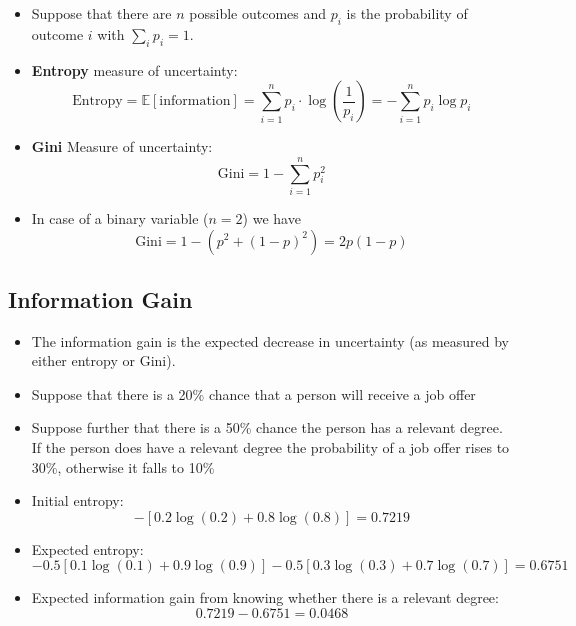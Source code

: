 \begin{itemize}
    \item Suppose that there are $n$ possible outcomes and $p_{i}$ is the probability of outcome $i$ with $\sum _{i} p_{i} =1$.
    \item \textbf{Entropy} measure of uncertainty:
          \begin{equation*}
              \text{Entropy} =\mathbb{E}\left[\text{information}\right] =\sum _{i=1}^{n} p_{i} \cdot \log\left(\frac{1}{p_{i}}\right) =-\sum _{i=1}^{n} p_{i}\log p_{i}
          \end{equation*}
    \item \textbf{Gini} Measure of uncertainty:
          \begin{equation*}
              \text{Gini} =1-\sum _{i=1}^{n} p_{i}^{2}
          \end{equation*}
    \item In case of a binary variable ($n=2$) we have
          \begin{equation*}
              \text{Gini} =1-\left( p^{2} +\left( 1-p\right)^{2}\right) =2p\left( 1-p\right)
          \end{equation*}
\end{itemize}

\subsection{Information Gain}

\begin{itemize}
    \item The information gain is the expected decrease in uncertainty (as measured by either entropy or Gini).
    \item Suppose that there is a 20\% chance that a person will receive a job offer
    \item Suppose further that there is a 50\% chance the person has a relevant degree. If the person does have a relevant degree the probability of a job offer rises to 30\%, otherwise it falls to 10\%
    \item Initial entropy:
          \begin{equation*}
              -[ 0.2\log( 0.2) +0.8\log( 0.8)] =0.7219
          \end{equation*}
    \item Expected entropy:
          \begin{equation*}
              -0.5\left[ 0.1\log\left( 0.1\right) +0.9\log\left( 0.9\right)\right] -0.5\left[ 0.3\log\left( 0.3\right) +0.7\log\left( 0.7\right)\right] =0.6751\ \ \ \ 
          \end{equation*}
    \item Expected information gain from knowing whether there is a relevant degree:
          \begin{equation*}
              0.7219-0.6751=0.0468
          \end{equation*}
\end{itemize}

